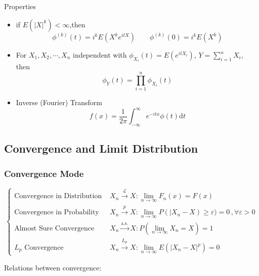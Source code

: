     Properties
    \begin{itemize}
    \item if $E(|X|^k)<\infty$,then
    \[
        \phi^{(k)}(t)=i^kE(X^ke^{itX})\qquad \phi^{(k)}(0)=i^kE(X^k)    
    \]
    \item For $X_1,X_2,\cdots,X_n$ independent with $\phi_{X_i}(t)=E(e^{itX_i})$, $Y={\displaystyle \sum_{i=1}^n} X_i$, then
    \[
        \phi_Y(t)=\prod_{i=1}^n \phi_{X_i}(t)
    \]
    \item Inverse (Fourier) Transform
    \[
        f(x)=\frac{1}{2\pi}\int_{-\infty}^\infty e^{-itx}\phi(t)\mathrm{d}t    
    \]
\end{itemize}



\subsection{Convergence and Limit Distribution}
\subsubsection{Convergence Mode}
    \[
        \begin{cases}
            \text{Convergence in Distribution }&{\displaystyle X_n\xrightarrow[]{\mathscr{L}}X:\lim_{n\to\infty}F_n(x)=F(x)}\\
            \text{Convergence in Probability }&{\displaystyle X_n\xrightarrow[]{p}X:\lim_{n\to\infty}P(|X_n-X)\geq\varepsilon)=0\, ,\forall\varepsilon>0}\\
            \text{Almost Sure Convergence }&{\displaystyle X_n\xrightarrow[]{\text{a.s.}}X:P(\lim_{n\to\infty}X_n=X)=1}\\
            L_p\text{ Convergence }&{\displaystyle X_n\xrightarrow[]{L_p}X:\lim_{n\to\infty}E(|X_n-X|^p)=0}
        \end{cases}
    \]

        Relations between convergence:
        \begin{center}
        \end{center}

